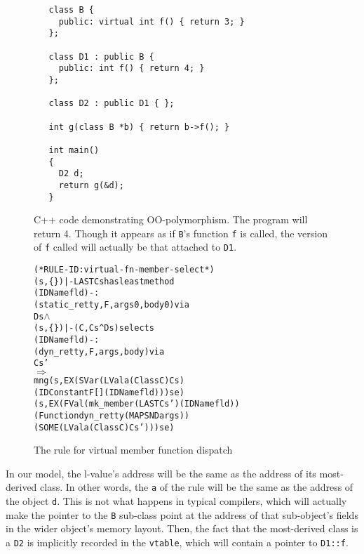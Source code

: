\documentclass[11pt]{article}
\newcommand{\lbr}{\texttt{\{}}
\newcommand{\rbr}{\texttt{\}}}
\begin{document}
\begin{figure}[hbtp]
\begin{verbatim}
   class B {
     public: virtual int f() { return 3; }
   };

   class D1 : public B {
     public: int f() { return 4; }
   };

   class D2 : public D1 { };

   int g(class B *b) { return b->f(); }

   int main()
   {
     D2 d;
     return g(&d);
   }
\end{verbatim}
\caption{C++ code demonstrating OO-polymorphism.  The program will
  return 4. Though it appears as if \texttt{B}'s function \texttt{f}
  is called, the version of \texttt{f} called will actually be that
  attached to \texttt{D1}.}
\label{fig:oo-example}
\end{figure}

\begin{figure}[hbtp]
\begin{center}
\begin{minipage}{\textwidth}
%
\begin{alltt}
(* RULE-ID: virtual-fn-member-select *)
     (s,\lbr\rbr) |- LAST Cs has least method
                 (IDName fld) -:
                 (static_retty,F,args0,body0) via
                 Ds \(\land\)
     (s,\lbr\rbr) |- (C,Cs ^ Ds) selects
                 (IDName fld) -:
                 (dyn_retty,F,args,body) via
                 Cs'
   \(\Rightarrow\)
     mng (s, EX (SVar (LVal a (Class C) Cs)
                      (IDConstant F [] (IDName fld))) se)
         (s, EX (FVal (mk_member (LAST Cs') (IDName fld))
                      (Function dyn_retty (MAP SND args))
                      (SOME (LVal a (Class C) Cs'))) se)

\end{alltt}
\end{minipage}
\end{center}
\caption{The rule for virtual member function dispatch}
\label{fig:virtual-fn-member-select}
\end{figure}

In our model, the l-value's address will be the same as the address of
its most-derived class.  In other words, the \texttt{a} of the rule
will be the same as the address of the object \texttt{d}.  This is not
what happens in typical compilers, which will actually make the
pointer to the \texttt{B} sub-class point at the address of that
sub-object's fields in the wider object's memory layout.  Then, the
fact that the most-derived class is a \texttt{D2} is implicitly
recorded in the \texttt{vtable}, which will contain a pointer to
\texttt{D1::f}.
\end{document}
